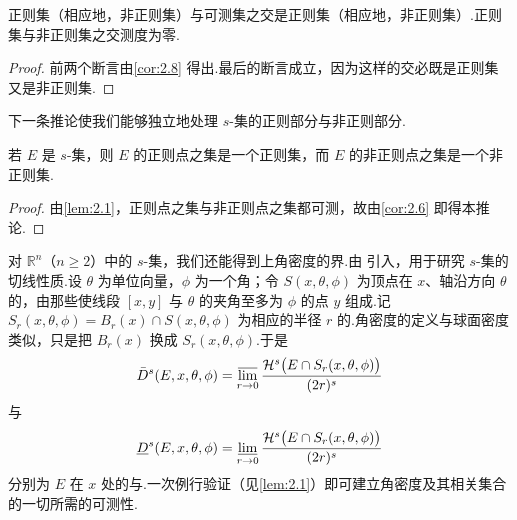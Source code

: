 \begin{corollary}\label{cor:2.9}
正则集（相应地，非正则集）与可测集之交是正则集（相应地，非正则集）.正则集与非正则集之交测度为零.
\end{corollary}

\begin{proof}
前两个断言由\cref{cor:2.8} 得出.最后的断言成立，因为这样的交必既是正则集又是非正则集.
\end{proof}

下一条推论使我们能够独立地处理 $s$-集的正则部分与非正则部分.

\begin{corollary}\label{cor:2.10}
若 $E$ 是 $s$-集，则 $E$ 的正则点之集是一个正则集，而 $E$ 的非正则点之集是一个非正则集.
\end{corollary}

\begin{proof}
由\cref{lem:2.1}，正则点之集与非正则点之集都可测，故由\cref{cor:2.6} 即得本推论.
\end{proof}

对 $\mathbb{R}^n$（$n\geq 2$）中的 $s$-集，我们还能得到上角密度的界.由 \textcite{besicovitch1929,besicovitch1938} 引入，用于研究 $s$-集的切线性质.设 $\theta$ 为单位向量，$\phi$ 为一个角；令 $S(x,\theta,\phi)$ 为顶点在 $x$、轴沿方向 $\theta$ 的，由那些使线段 $[x,y]$ 与 $\theta$ 的夹角至多为 $\phi$ 的点 $y$ 组成.记 $S_r(x,\theta,\phi)=B_r(x)\cap S(x,\theta,\phi)$ 为相应的半径 $r$ 的.角密度的定义与球面密度类似，只是把 $B_r(x)$ 换成 $S_r(x,\theta,\phi)$.于是
\[
  \bar{D}^{s}(E,x,\theta,\phi)=\varlimsup_{r\to 0}\frac{\mathcal{H}^{s}\bigl(E\cap S_r(x,\theta,\phi)\bigr)}{(2r)^{s}}
\]
与
\[
  \underline{D}^{s}(E,x,\theta,\phi)=\varliminf_{r\to 0}\frac{\mathcal{H}^{s}\bigl(E\cap S_r(x,\theta,\phi)\bigr)}{(2r)^{s}}
\]
分别为 $E$ 在 $x$ 处的与.一次例行验证（见\cref{lem:2.1}）即可建立角密度及其相关集合的一切所需的可测性.

